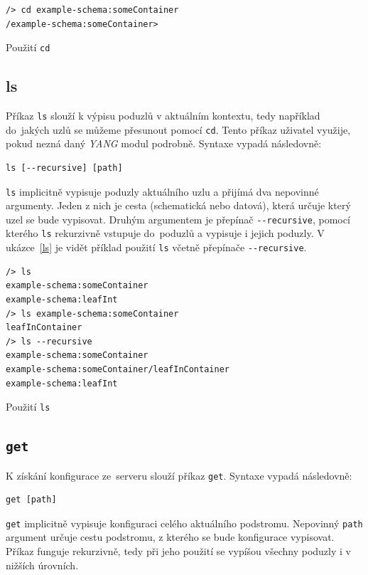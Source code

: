 \documentclass[thesis=B,czech,hidelinks]{FITthesis}[2019/03/06]
\begin{document}
\begin{listing}[H]
\begin{verbatim}
/> cd example-schema:someContainer
/example-schema:someContainer>
\end{verbatim}
\caption{Použití \texttt{cd}}\label{cd}
\end{listing}

\subsection{ls}
Příkaz \texttt{ls} slouží k výpisu poduzlů v aktuálním kontextu, tedy například do~jakých uzlů se můžeme přesunout pomocí \texttt{cd}. Tento příkaz uživatel využije, pokud nezná daný \textit{YANG} modul podrobně. Syntaxe vypadá následovně:
\begin{verbatim}
ls [--recursive] [path]
\end{verbatim}
\texttt{ls} implicitně vypisuje poduzly aktuálního uzlu a přijímá dva nepovinné argumenty. Jeden z nich je cesta (schematická nebo datová), která určuje který uzel se bude vypisovat. Druhým argumentem je přepínač \verb¨--recursive¨, pomocí kterého \texttt{ls} rekurzivně vstupuje do~poduzlů a vypisuje i jejich poduzly. V ukázce~\ref{ls} je vidět příklad použití \texttt{ls} včetně přepínače \verb¨--recursive¨.

\begin{listing}[H]
\begin{verbatim}
/> ls
example-schema:someContainer
example-schema:leafInt
/> ls example-schema:someContainer
leafInContainer
/> ls --recursive
example-schema:someContainer
example-schema:someContainer/leafInContainer
example-schema:leafInt
\end{verbatim}
\caption{Použití \texttt{ls}}\label{ls}
\end{listing}
\subsection{\texttt{get}}

K získání konfigurace ze~serveru slouží příkaz \texttt{get}. Syntaxe vypadá následovně:
\begin{verbatim}
get [path]
\end{verbatim}
\texttt{get} implicitně vypisuje konfiguraci celého aktuálního podstromu. Nepovinný \texttt{path} argument určuje cestu podstromu, z kterého se bude konfigurace vypisovat. Příkaz funguje rekurzivně, tedy při jeho použití se vypíšou všechny poduzly i v nižších úrovních.
\end{document}
